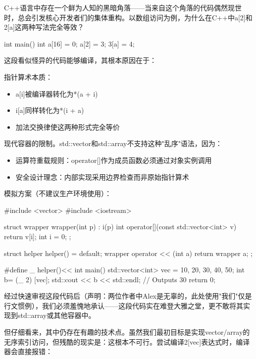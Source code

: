 C++语言中存在一个鲜为人知的黑暗角落——当来自这个角落的代码偶然现世时，总会引发核心开发者们的集体重构。以数组访问为例，为什么在C++中a[2]和2[a]这两种写法完全等效？

\begin{cpp}
int main() {
  int a[16] = {0};
  a[2] = 3;
  3[a] = 4;
}
\end{cpp}

这段看似怪异的代码能够编译，其根本原因在于：


指针算术本质：

\begin{itemize}
\item 
a[i]被编译器转化为*(a + i)

\item 
i[a]同样转化为*(i + a)

\item 
加法交换律使这两种形式完全等价
\end{itemize}

现代容器的限制。std::vector和std::array不支持这种"乱序"语法，因为：

\begin{itemize}
\item 
运算符重载规则：operator[]作为成员函数必须通过对象实例调用

\item 
安全设计理念：内部实现采用边界检查而非原始指针算术
\end{itemize}

模拟方案（不建议生产环境使用）：

\begin{cpp}
#include <vector>
#include <iostream>

struct wrapper {
  wrapper(int p) : i(p) {}
  int operator[](const std::vector<int> v) {return v[i];}
  int i = 0;
};

struct helper {
  helper() = default;
  wrapper operator << (int a) { return wrapper {a}; }
};

#define _ helper()<<
int main() {
  std::vector<int> vec = {10, 20, 30, 40, 50};
  int b= (_ 2) [vec];
  std::cout << b << std::endl; // Outputs 30
  return 0;
}
\end{cpp}

经过快速审视这段代码后（声明：两位作者中Alex是无辜的，此处使用"我们"仅是行文惯例），我们必须羞愧地承认——这段代码实在难登大雅之堂，更不敢将其实现到std::array或其他容器中。

但仔细看来，其中仍存在有趣的技术点。虽然我们最初目标是实现vector/array的无序索引访问，但残酷的现实是：这根本不可行。尝试编译2[vec]表达式时，编译器会直接报错：

